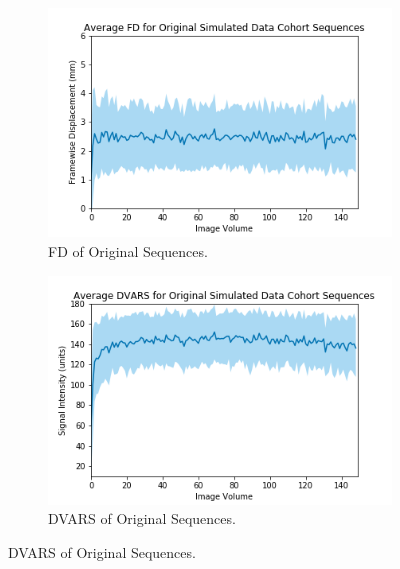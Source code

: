 \begin{figure}[]
	\centering
	\begin{subfigure}{0.4\textwidth}
		\centering
		\includegraphics[width=1.0\textwidth]{6/figures/spectr-bold-fd-150.png}
		\caption{FD of Original Sequences.}
	\end{subfigure}
	\hspace{0.05\textwidth}
	\begin{subfigure}{0.4\textwidth}
		\centering
		\includegraphics[width=1.0\textwidth]{6/figures/spectr-bold-dvars-150.png}
		\caption{DVARS of Original Sequences.}
	\end{subfigure}
	

\end{figure}
